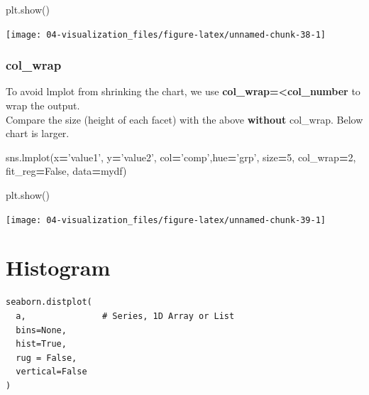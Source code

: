 \documentclass[
]{book}
\newenvironment{Shaded}{\begin{snugshade}}{\end{snugshade}}
\newcommand{\DecValTok}[1]{\textcolor[rgb]{0.06,0.06,0.06}{#1}}
\newcommand{\NormalTok}[1]{#1}
\newcommand{\OperatorTok}[1]{\textcolor[rgb]{0.43,0.43,0.43}{\textbf{#1}}}
\newcommand{\StringTok}[1]{\textcolor[rgb]{0.5,0.5,0.5}{#1}}
\newcommand{\VariableTok}[1]{\textcolor[rgb]{0,0,0}{#1}}
\begin{document}
\begin{Shaded}
\begin{Highlighting}[]
\NormalTok{plt.show()}
\end{Highlighting}
\end{Shaded}

\texttt{[image: 04-visualization\_files/figure-latex/unnamed-chunk-38-1]}

\hypertarget{col_wrap}{%
\subsubsection{col\_wrap}\label{col_wrap}}

To avoid lmplot from shrinking the chart, we use \textbf{col\_wrap=\textless col\_number} to wrap the output.\\
Compare the size (height of each facet) with the above \textbf{without} col\_wrap. Below chart is larger.

\begin{Shaded}
\begin{Highlighting}[]
\NormalTok{sns.lmplot(x}\OperatorTok{=}\StringTok{'value1'}\NormalTok{, y}\OperatorTok{=}\StringTok{'value2'}\NormalTok{, col}\OperatorTok{=}\StringTok{'comp'}\NormalTok{,hue}\OperatorTok{=}\StringTok{'grp'}\NormalTok{, size}\OperatorTok{=}\DecValTok{5}\NormalTok{, col_wrap}\OperatorTok{=}\DecValTok{2}\NormalTok{, fit_reg}\OperatorTok{=}\VariableTok{False}\NormalTok{, data}\OperatorTok{=}\NormalTok{mydf)}
\end{Highlighting}
\end{Shaded}

\begin{Shaded}
\begin{Highlighting}[]
\NormalTok{plt.show()}
\end{Highlighting}
\end{Shaded}

\texttt{[image: 04-visualization\_files/figure-latex/unnamed-chunk-39-1]}

\hypertarget{histogram-1}{%
\section{Histogram}\label{histogram-1}}

\begin{verbatim}
seaborn.distplot(
  a,               # Series, 1D Array or List
  bins=None,
  hist=True,
  rug = False,
  vertical=False
)
\end{verbatim}
\end{document}
